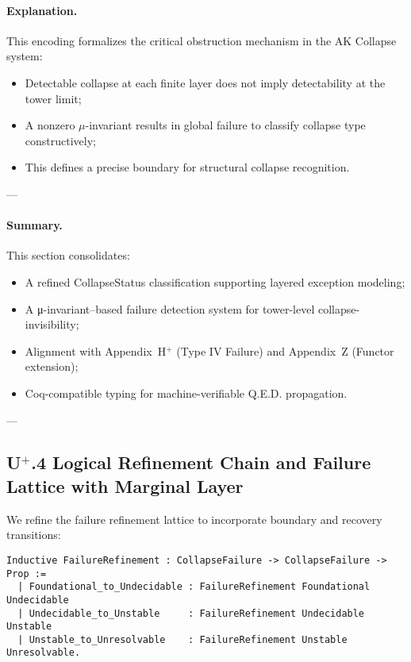 \documentclass[11pt]{article}
\begin{document}
\paragraph{Explanation.}
This encoding formalizes the critical obstruction mechanism in the AK Collapse system:
\begin{itemize}
    \item Detectable collapse at each finite layer does not imply detectability at the tower limit;
    \item A nonzero $\mu$-invariant results in global failure to classify collapse type constructively;
    \item This defines a precise boundary for structural collapse recognition.
\end{itemize}

---

\paragraph{Summary.}
This section consolidates:
\begin{itemize}
    \item A refined CollapseStatus classification supporting layered exception modeling;
    \item A μ-invariant–based failure detection system for tower-level collapse-invisibility;
    \item Alignment with Appendix~H$^{+}$ (Type IV Failure) and Appendix~Z (Functor extension);
    \item Coq-compatible typing for machine-verifiable Q.E.D. propagation.
\end{itemize}

---

\subsection*{U$^{+}$.4 Logical Refinement Chain and Failure Lattice with Marginal Layer}

We refine the failure refinement lattice to incorporate boundary and recovery transitions:

\begin{lstlisting}[language=Coq]
Inductive FailureRefinement : CollapseFailure -> CollapseFailure -> Prop :=
  | Foundational_to_Undecidable : FailureRefinement Foundational Undecidable
  | Undecidable_to_Unstable     : FailureRefinement Undecidable Unstable
  | Unstable_to_Unresolvable    : FailureRefinement Unstable Unresolvable.
\end{lstlisting}
\end{document}
